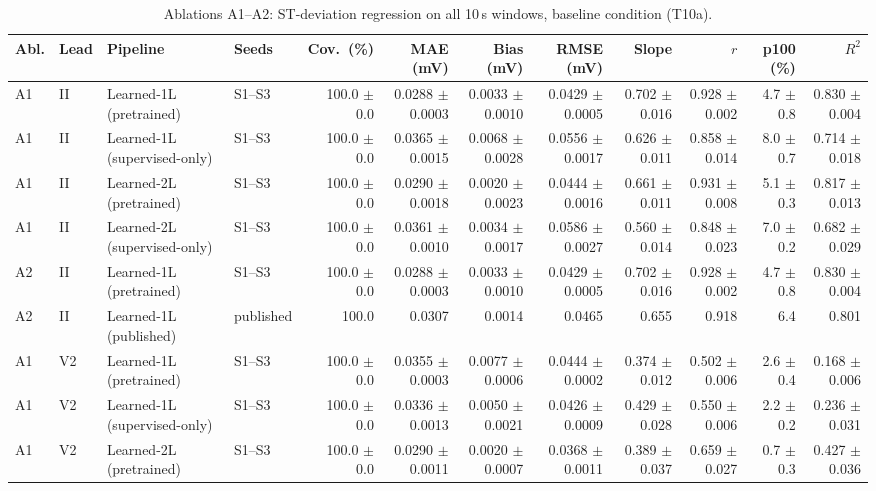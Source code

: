 \begin{table}[htbp]
\centering
\small
\caption{Ablations A1--A2: ST-deviation regression on all 10\,s windows, baseline condition (T10a).}
\label{tab:t10_regression}
\begin{tabular}{llllrrrrrrrr}
\toprule
Abl. & Lead & Pipeline & Seeds & Cov.\ (\%) & MAE (mV) & Bias (mV) & RMSE (mV) & Slope & $r$ & p100 (\%) & $R^2$ \\
\midrule
A1 & II & Learned-1L (pretrained) & S1--S3 & 100.0 $\pm$ 0.0 & 0.0288 $\pm$ 0.0003 & 0.0033 $\pm$ 0.0010 & 0.0429 $\pm$ 0.0005 & 0.702 $\pm$ 0.016 & 0.928 $\pm$ 0.002 & 4.7 $\pm$ 0.8 & 0.830 $\pm$ 0.004 \\
A1 & II & Learned-1L (supervised-only) & S1--S3 & 100.0 $\pm$ 0.0 & 0.0365 $\pm$ 0.0015 & 0.0068 $\pm$ 0.0028 & 0.0556 $\pm$ 0.0017 & 0.626 $\pm$ 0.011 & 0.858 $\pm$ 0.014 & 8.0 $\pm$ 0.7 & 0.714 $\pm$ 0.018 \\
A1 & II & Learned-2L (pretrained) & S1--S3 & 100.0 $\pm$ 0.0 & 0.0290 $\pm$ 0.0018 & 0.0020 $\pm$ 0.0023 & 0.0444 $\pm$ 0.0016 & 0.661 $\pm$ 0.011 & 0.931 $\pm$ 0.008 & 5.1 $\pm$ 0.3 & 0.817 $\pm$ 0.013 \\
A1 & II & Learned-2L (supervised-only) & S1--S3 & 100.0 $\pm$ 0.0 & 0.0361 $\pm$ 0.0010 & 0.0034 $\pm$ 0.0017 & 0.0586 $\pm$ 0.0027 & 0.560 $\pm$ 0.014 & 0.848 $\pm$ 0.023 & 7.0 $\pm$ 0.2 & 0.682 $\pm$ 0.029 \\
A2 & II & Learned-1L (pretrained) & S1--S3 & 100.0 $\pm$ 0.0 & 0.0288 $\pm$ 0.0003 & 0.0033 $\pm$ 0.0010 & 0.0429 $\pm$ 0.0005 & 0.702 $\pm$ 0.016 & 0.928 $\pm$ 0.002 & 4.7 $\pm$ 0.8 & 0.830 $\pm$ 0.004 \\
A2 & II & Learned-1L (published) & published & 100.0 & 0.0307 & 0.0014 & 0.0465 & 0.655 & 0.918 & 6.4 & 0.801 \\
\midrule
A1 & V2 & Learned-1L (pretrained) & S1--S3 & 100.0 $\pm$ 0.0 & 0.0355 $\pm$ 0.0003 & 0.0077 $\pm$ 0.0006 & 0.0444 $\pm$ 0.0002 & 0.374 $\pm$ 0.012 & 0.502 $\pm$ 0.006 & 2.6 $\pm$ 0.4 & 0.168 $\pm$ 0.006 \\
A1 & V2 & Learned-1L (supervised-only) & S1--S3 & 100.0 $\pm$ 0.0 & 0.0336 $\pm$ 0.0013 & 0.0050 $\pm$ 0.0021 & 0.0426 $\pm$ 0.0009 & 0.429 $\pm$ 0.028 & 0.550 $\pm$ 0.006 & 2.2 $\pm$ 0.2 & 0.236 $\pm$ 0.031 \\
A1 & V2 & Learned-2L (pretrained) & S1--S3 & 100.0 $\pm$ 0.0 & 0.0290 $\pm$ 0.0011 & 0.0020 $\pm$ 0.0007 & 0.0368 $\pm$ 0.0011 & 0.389 $\pm$ 0.037 & 0.659 $\pm$ 0.027 & 0.7 $\pm$ 0.3 & 0.427 $\pm$ 0.036 \\

\end{tabular}
\end{table}
